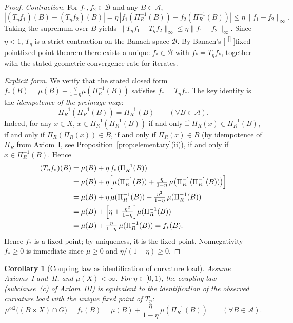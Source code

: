 \documentclass[11pt]{article}
\newcounter{ReviewerNoteCount}
\newcommand{\reviewer}[2]{%
    \stepcounter{ReviewerNoteCount}%
    {\color{blue}#1}%
    \textsuperscript{\color{blue}[\theReviewerNoteCount]}%
    \marginpar{\linespread{1.1}\selectfont\color{red}\scriptsize\raggedright\textbf{[\theReviewerNoteCount]} #2}%
}
\numberwithin{equation}{section}
\newtheorem{corollary}[theorem]{Corollary}
\theoremstyle{definition}
\begin{document}
\begin{proof}
\emph{Contraction.} For $f_1,f_2\in\mathcal B$ and any $B\in\mathcal A$,
\[
|(T_\eta f_1)(B)-(T_\eta f_2)(B)|=\eta\,|f_1(\Pi_R^{-1}(B))-f_2(\Pi_R^{-1}(B))|\le\eta\|f_1-f_2\|_\infty.
\]
Taking the supremum over $B$ yields $\|T_\eta f_1-T_\eta f_2\|_\infty\le\eta\|f_1-f_2\|_\infty$. Since $\eta<1$, $T_\eta$ is a strict contraction on the Banach space $\mathcal B$. By Banach's \reviewer[3]{fixed--point}{fixed-point} theorem there exists a unique $f_*\in\mathcal B$ with $f_*=T_\eta f_*$, together with the stated geometric convergence rate for iterates.

\emph{Explicit form.} We verify that the stated closed form $f_*(B)=\mu(B)+\tfrac{\eta}{1-\eta}\mu(\Pi_R^{-1}(B))$ satisfies $f_*=T_\eta f_*$. The key identity is the \emph{idempotence of the preimage map}:
\[
\Pi_R^{-1}(\Pi_R^{-1}(B))=\Pi_R^{-1}(B)\qquad(\forall B\in\mathcal A).
\]
Indeed, for any $x\in X$, $x\in\Pi_R^{-1}(\Pi_R^{-1}(B))$ if and only if $\Pi_R(x)\in\Pi_R^{-1}(B)$, if and only if $\Pi_R(\Pi_R(x))\in B$, if and only if $\Pi_R(x)\in B$ (by idempotence of $\Pi_R$ from Axiom~I, see Proposition~\ref{prop:elementary}(ii)), if and only if $x\in\Pi_R^{-1}(B)$. Hence
\begin{align*}
(T_\eta f_*)(B)
&=\mu(B)+\eta\,f_*(\Pi_R^{-1}(B))\\
&=\mu(B)+\eta\Bigl[\mu(\Pi_R^{-1}(B))+\tfrac{\eta}{1-\eta}\,\mu\bigl(\Pi_R^{-1}(\Pi_R^{-1}(B))\bigr)\Bigr]\\
&=\mu(B)+\eta\,\mu(\Pi_R^{-1}(B))+\tfrac{\eta^2}{1-\eta}\,\mu(\Pi_R^{-1}(B))\\
&=\mu(B)+\Bigl[\eta+\tfrac{\eta^2}{1-\eta}\Bigr]\mu(\Pi_R^{-1}(B))\\
&=\mu(B)+\tfrac{\eta}{1-\eta}\,\mu(\Pi_R^{-1}(B))=f_*(B).
\end{align*}
Hence $f_*$ is a fixed point; by uniqueness, it is the fixed point. Nonnegativity $f_*\ge 0$ is immediate since $\mu\ge 0$ and $\eta/(1-\eta)\ge 0$.
\end{proof}

\begin{corollary}[Coupling law as identification of curvature load]\label{cor:coupling-identification}
Assume Axioms~I and~II, and $\mu(X)<\infty$. For $\eta\in[0,1)$, the coupling law (subclause~(c) of Axiom~III) is equivalent to the identification of the observed curvature load with the unique fixed point of $T_\eta$:
\[
\mu^{\otimes2}\bigl((B\times X)\cap G\bigr)=f_*(B)=\mu(B)+\frac{\eta}{1-\eta}\,\mu(\Pi_R^{-1}(B))
\qquad(\forall B\in\mathcal A).
\]
\end{corollary}
\end{document}
